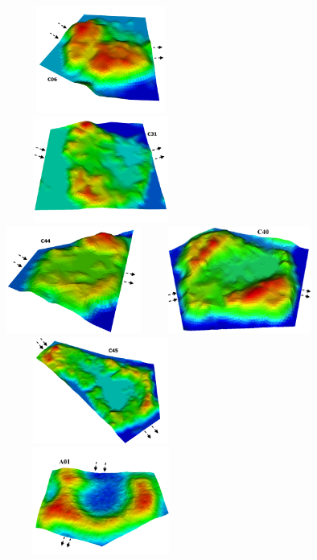 \documentclass[review,11pt]{elsarticle}
\begin{document}
\begin{figure}[!h]
\centering
\vskip -2cm
\includegraphics[width=6.2cm, height=3.5cm]{./figures/polygons-finescale/3Dpolygon06-3B.png}
\includegraphics[width=6.2cm, height=3.5cm]{./figures/polygons-finescale/3Dpolygon31-3B.png}\\
\includegraphics[width=6.cm, height=3.5cm]{./figures/polygons-finescale/3Dpolygon44-3B.png}
\includegraphics[width=6.2cm, height=3.5cm]{./figures/polygons-finescale/3Dpolygon40-1.png} \\
 \includegraphics[width=6.2cm, height=3.5cm]{./figures/polygons-finescale/3Dpolygon45-3B.png}
\includegraphics[width=6.2cm, height=3.5cm]{./figures/polygons-finescale/3DpolygonA01-3E.png}\\

\end{figure}
\end{document}
